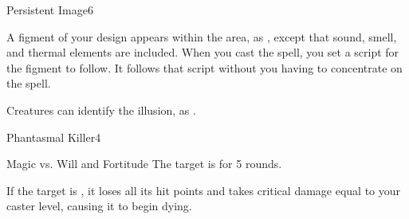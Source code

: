 \begin{spellsection}{Persistent Image}{6}
\begin{spellheader}
\end{spellheader}
\begin{spellcontent}
    \begin{spelltargetinginfo}
    \end{spelltargetinginfo}
    \begin{spelleffects}
        \spelleffect A figment of your design appears within the area, as , except that sound, smell, and thermal elements are included. When you cast the spell, you set a script for the figment to follow. It follows that script without you having to concentrate on the spell.
        \spelldur \durmed \dismissable
    \end{spelleffects}
\end{spellcontent}
\begin{spellfooter}
    \spellnotes Creatures can identify the illusion, as .
\end{spellfooter}
\end{spellsection}

\begin{spellsection}{Phantasmal Killer}{4}
\begin{spellheader}
\end{spellheader}
\begin{spellcontent}
    \begin{spelltargetinginfo}
    \end{spelltargetinginfo}
    \begin{spelleffects}
        \begin{spellattack}{Magic vs. Will and Fortitude}
            \spellsuccess[Will] The target is \shaken for 5 rounds.

             If the target is \bloodied, it loses all its hit points and takes critical damage equal to your caster level, causing it to begin dying.
        \end{spellattack}
    \end{spelleffects}
\end{spellcontent}
\begin{spellfooter}
\end{spellfooter}
\end{spellsection}

